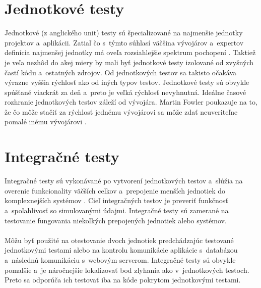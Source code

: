 \documentclass[
  digital, %
  table,   %
oneside,
  nolof,     %
  nolot,     %
]{fithesis3}
\begin{document}
\section{Jednotkové testy}
Jednotkové (z anglického unit) testy sú špecializované na najmenšie jednotky projektov a~aplikácii. Zatiaľ čo s~týmto súhlasí väčšina vývojárov a~expertov definícia najmenšej jednotky má oveľa rozsiahlejšie spektrum pochopení \cite{codeMaintability}\cite{effectiveSoftwareTesting}. Taktiež je veľa nezhôd do akej miery by mali byť jednotkové testy izolované od zvyšných častí kódu a~ostatných zdrojov. Od jednotkových testov sa takisto očakáva výrazne vyššia rýchlosť ako od iných typov testov. Jednotkové testy sú obvykle spúšťané viackrát za deň a~preto je veľká rýchlosť nevyhnutná. Ideálne časové rozhranie jednotkových testov záleží od vývojára. Martin Fowler poukazuje na to, že čo môže stačiť za rýchlosť jednému vývojárovi sa môže zdať neuveriteľne pomalé inému vývojárovi \cite{unitTest}.
\section{Integračné testy}
Integračné testy sú vykonávané po vytvorení jednotkových testov a~slúžia na overenie funkcionality väčších celkov a~prepojenie menších jednotiek do komplexnejších systémov \cite{testSeparation}. Cieľ integračných testov je preveriť funkčnosť a~spoľahlivosť so simulovanými údajmi. Integračné testy sú zamerané na testovanie fungovania niekoľkých prepojených jednotiek alebo systémov.\paragraph{}
Môžu byť použité na otestovanie dvoch jednotiek predchádzajúc testované jednotkovými testami alebo na kontrolu komunikácie aplikácie s~databázou a~následnú komunikáciu s~webovým serverom. Integračné testy sú obvykle pomalšie a~je náročnejšie lokalizovať bod zlyhania ako v~jednotkových  testoch. Preto sa odporúča ich testovať iba na kóde pokrytom jednotkovými testami.
\end{document}
